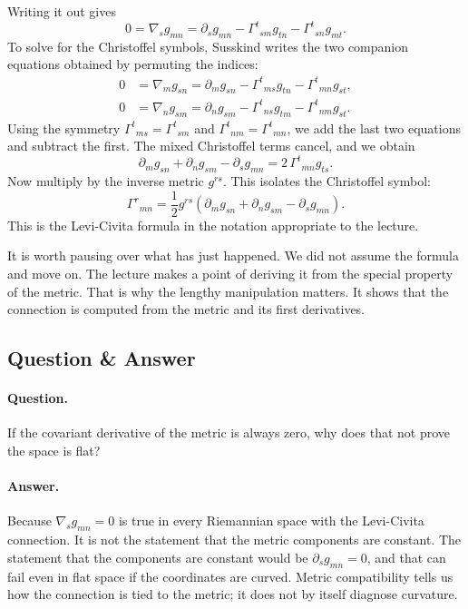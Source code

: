Writing it out gives
\begin{equation}
0
=
\nabla_s g_{mn}
=
\partial_s g_{mn}
-\Gamma^{t}{}_{sm}g_{tn}
-\Gamma^{t}{}_{sn}g_{mt}.
\end{equation}
To solve for the Christoffel symbols, Susskind writes the two companion equations obtained by permuting the indices:
\begin{align}
0
&=
\nabla_m g_{sn}
=
\partial_m g_{sn}
-\Gamma^{t}{}_{ms}g_{tn}
-\Gamma^{t}{}_{mn}g_{st},\\
0
&=
\nabla_n g_{sm}
=
\partial_n g_{sm}
-\Gamma^{t}{}_{ns}g_{tm}
-\Gamma^{t}{}_{nm}g_{st}.
\end{align}
Using the symmetry \(\Gamma^{t}{}_{ms}=\Gamma^{t}{}_{sm}\) and \(\Gamma^{t}{}_{nm}=\Gamma^{t}{}_{mn}\), we add the last two equations and subtract the first. The mixed Christoffel terms cancel, and we obtain
\begin{equation}
\partial_m g_{sn}+\partial_n g_{sm}-\partial_s g_{mn}
=
2\,\Gamma^{t}{}_{mn}g_{ts}.
\end{equation}
Now multiply by the inverse metric \(g^{rs}\). This isolates the Christoffel symbol:
\begin{equation}
\Gamma^{r}{}_{mn}
=
\frac12 g^{rs}
\left(
\partial_m g_{sn}
+
\partial_n g_{sm}
-
\partial_s g_{mn}
\right).
\end{equation}
This is the Levi-Civita formula in the notation appropriate to the lecture.

It is worth pausing over what has just happened. We did not assume the formula and move on. The lecture makes a point of deriving it from the special property of the metric. That is why the lengthy manipulation matters. It shows that the connection is computed from the metric and its first derivatives.

\subsection{Question \& Answer}

\paragraph{Question.} If the covariant derivative of the metric is always zero, why does that not prove the space is flat?

\paragraph{Answer.} Because \(\nabla_s g_{mn}=0\) is true in every Riemannian space with the Levi-Civita connection. It is not the statement that the metric components are constant. The statement that the components are constant would be \(\partial_s g_{mn}=0\), and that can fail even in flat space if the coordinates are curved. Metric compatibility tells us how the connection is tied to the metric; it does not by itself diagnose curvature.


